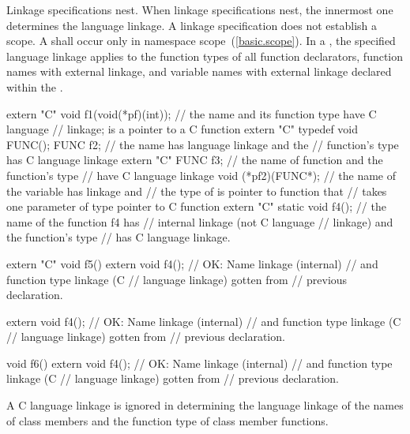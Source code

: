 \pnum
{}%
Linkage specifications nest. When linkage specifications nest, the
innermost one determines the language linkage. A linkage specification
does not establish a scope. A  shall
occur only in namespace scope~(\ref{basic.scope}). In a
, the specified language linkage applies
to the function types of all function declarators, function names with
external linkage, and variable names with external linkage declared
within the .
\enterexample

\begin{codeblock}
extern "C" void f1(void(*pf)(int));
                                // the name  and its function type have C language
                                // linkage;  is a pointer to a C function
extern "C" typedef void FUNC();
FUNC f2;                        // the name  has \Cpp language linkage and the
                                // function's type has C language linkage
extern "C" FUNC f3;             // the name of function  and the function's type
                                // have C language linkage
void (*pf2)(FUNC*);             // the name of the variable  has \Cpp linkage and
                                // the type of  is pointer to \Cpp function that
                                // takes one parameter of type pointer to C function
extern "C" {
  static void f4();             // the name of the function f4 has
                                // internal linkage (not C language
                                // linkage) and the function's type
                                // has C language linkage.
}

extern "C" void f5() {
  extern void f4();             // OK: Name linkage (internal)
                                // and function type linkage (C
                                // language linkage) gotten from
                                // previous declaration.
}

extern void f4();               // OK: Name linkage (internal)
                                // and function type linkage (C
                                // language linkage) gotten from
                                // previous declaration.

void f6() {
  extern void f4();             // OK: Name linkage (internal)
                                // and function type linkage (C
                                // language linkage) gotten from
                                // previous declaration.
}
\end{codeblock}
\exitexample
{}%
A C language linkage is ignored
in determining the language linkage of
the names of class members and the
function type of class member functions.
\enterexample

